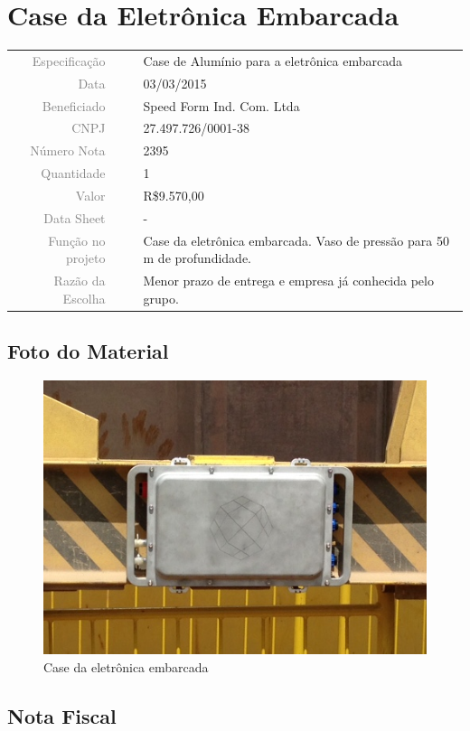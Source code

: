 

\section{Case da Eletrônica Embarcada}
\label{case}

 
\begin{table}[ht!]

	\begin{tabular}{r l|l p{12cm} }
		
		\textcolor{gray}{Especificação} &&& 	{Case de Alumínio para a eletrônica
		embarcada}\\
		\textcolor{gray}{Data} &&& 				{03/03/2015}\\
        \textcolor{gray}{Beneficiado} &&&		{Speed Form Ind. Com. Ltda}
        \\
        \textcolor{gray}{CNPJ} &&& 				{27.497.726/0001-38} \\
        \textcolor{gray}{Número Nota} &&& 		{2395} \\
		\textcolor{gray}{Quantidade} &&& 		{1} \\
		\textcolor{gray}{Valor} &&& 			{R\$9.570,00} \\
		\textcolor{gray}{Data Sheet} &&& 		{-}
		\\

		\textcolor{gray}{Função no projeto} &&& {Case da eletrônica embarcada. Vaso de
		pressão para 50 m de profundidade. }
		\\
		\textcolor{gray}{Razão da Escolha} &&& {Menor prazo de entrega e empresa já
		conhecida pelo grupo.}
		\end{tabular}
\end{table}

\newpage
\subsection{Foto do Material}
\begin{figure}[H]
 \centering
 \includegraphics[width=1\columnwidth]{Case/foto.png}
 \caption{Case da eletrônica embarcada}  
\end{figure}

\subsection{Nota Fiscal}
